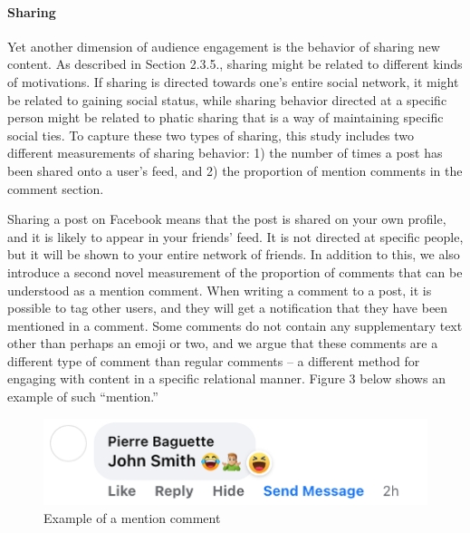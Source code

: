 \documentclass[
]{article}
\begin{document}
\hypertarget{sharing}{%
\paragraph*{Sharing}\label{sharing}}

\hspace{-2.5em}

\noindent Yet another dimension of audience engagement is the behavior
of sharing new content. As described in Section 2.3.5., sharing might be
related to different kinds of motivations. If sharing is directed
towards one's entire social network, it might be related to gaining
social status, while sharing behavior directed at a specific person
might be related to phatic sharing that is a way of maintaining specific
social ties. To capture these two types of sharing, this study includes
two different measurements of sharing behavior: 1) the number of times a
post has been shared onto a user's feed, and 2) the proportion of
mention comments in the comment section.

Sharing a post on Facebook means that the post is shared on your own
profile, and it is likely to appear in your friends' feed. It is not
directed at specific people, but it will be shown to your entire network
of friends. In addition to this, we also introduce a second novel
measurement of the proportion of comments that can be understood as a
mention comment. When writing a comment to a post, it is possible to tag
other users, and they will get a notification that they have been
mentioned in a comment. Some comments do not contain any supplementary
text other than perhaps an emoji or two, and we argue that these
comments are a different type of comment than regular comments -- a
different method for engaging with content in a specific relational
manner. Figure 3 below shows an example of such ``mention.''

\begin{figure}[H]

{\centering \includegraphics[width=0.8\linewidth]{images/mention_example} 

}

\caption{Example of a mention comment}\label{fig:mention_example}
\end{figure}
\end{document}
